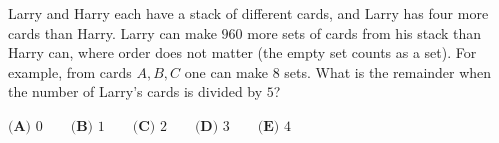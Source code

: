 Larry and Harry each have a stack of different cards, and Larry has four more cards than Harry. Larry can make $960$ more sets of cards from his stack than Harry can, where order does not matter (the empty set counts as a set). For example, from cards $A,B,C$ one can make $8$ sets. What is the remainder when the number of Larry's cards is divided by $5$?

$\textbf{(A) }0\qquad\textbf{(B) }1\qquad\textbf{(C) }2\qquad\textbf{(D) }3\qquad\textbf{(E) }4$
